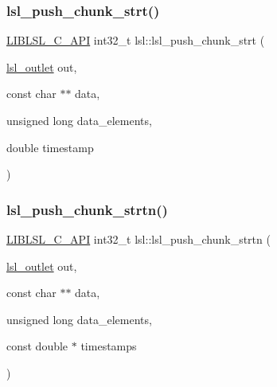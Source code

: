 \subsubsection{\texorpdfstring{lsl\+\_\+push\+\_\+chunk\+\_\+strt()}{lsl\_push\_chunk\_strt()}}
{\footnotesize\ttfamily \hyperlink{lsl__cpp_8h_aafd0ef1813e8be84a1420c4f1df64615}{L\+I\+B\+L\+S\+L\+\_\+\+C\+\_\+\+A\+PI} int32\+\_\+t lsl\+::lsl\+\_\+push\+\_\+chunk\+\_\+strt (\begin{DoxyParamCaption}\item[{\hyperlink{namespacelsl_abcf512b0f66dacf86c10b165995fd50b}{lsl\+\_\+outlet}}]{out,  }\item[{const char $\ast$$\ast$}]{data,  }\item[{unsigned long}]{data\+\_\+elements,  }\item[{double}]{timestamp }\end{DoxyParamCaption})}

\mbox{\label{namespacelsl_abbdff3e2051e7707fe9d3f2631fd5d18}} 
\subsubsection{\texorpdfstring{lsl\+\_\+push\+\_\+chunk\+\_\+strtn()}{lsl\_push\_chunk\_strtn()}}
{\footnotesize\ttfamily \hyperlink{lsl__cpp_8h_aafd0ef1813e8be84a1420c4f1df64615}{L\+I\+B\+L\+S\+L\+\_\+\+C\+\_\+\+A\+PI} int32\+\_\+t lsl\+::lsl\+\_\+push\+\_\+chunk\+\_\+strtn (\begin{DoxyParamCaption}\item[{\hyperlink{namespacelsl_abcf512b0f66dacf86c10b165995fd50b}{lsl\+\_\+outlet}}]{out,  }\item[{const char $\ast$$\ast$}]{data,  }\item[{unsigned long}]{data\+\_\+elements,  }\item[{const double $\ast$}]{timestamps }\end{DoxyParamCaption})}

\mbox{\label{namespacelsl_afcc56fcb63fe7c9f29f658c40f8e62f2}} 
